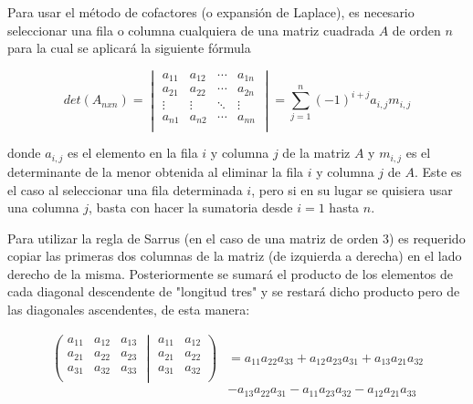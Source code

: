 \documentclass{article}
\begin{document}
Para usar el método de cofactores (o expansión de Laplace), es necesario seleccionar una fila o columna cualquiera de una matriz cuadrada $A$ de orden $n$ para la cual se aplicará la siguiente fórmula

\begin{equation}
    det(A_{nxn})
    =
    \begin{vmatrix}
        a_{11} & a_{12} & \cdots & a_{1n} \\
        a_{21} & a_{22} & \cdots & a_{2n} \\
        \vdots & \vdots & \ddots & \vdots \\
        a_{n1} & a_{n2} & \cdots & a_{nn} \\
    \end{vmatrix}
    =
    \sum_{j=1}^{n}(-1)^{i+j}a_{i,j}m_{i,j}
\end{equation}

donde $a_{i,j}$ es el elemento en la fila $i$ y columna $j$ de la matriz $A$ y $m_{i,j}$ es el determinante de la menor obtenida al eliminar la fila $i$ y columna $j$ de $A$. Este es el caso al seleccionar una fila determinada $i$, pero si en su lugar se quisiera usar una columna $j$, basta con hacer la sumatoria desde $i=1$ hasta $n$.

\vspace{5mm}

Para utilizar la regla de Sarrus (en el caso de una matriz de orden 3) es requerido copiar las primeras dos columnas de la matriz (de izquierda a derecha) en el lado derecho de la misma. Posteriormente se sumará el producto de los elementos de cada diagonal descendente de "longitud tres" y se restará dicho producto pero de las diagonales ascendentes, de esta manera:

\begin{equation}
    \begin{aligned}
        \left(
        \begin{matrix}
            a_{11} & a_{12} & a_{13} \\
            a_{21} & a_{22} & a_{23} \\
            a_{31} & a_{32} & a_{33} \\
        \end{matrix}
        \middle|
        \begin{matrix}
            a_{11} & a_{12} \\
            a_{21} & a_{22} \\
            a_{31} & a_{32} \\
        \end{matrix}
        \right)
        &= a_{11}a_{22}a_{33} + a_{12}a_{23}a_{31} + a_{13}a_{21}a_{32} \\
        & - a_{13}a_{22}a_{31} - a_{11}a_{23}a_{32} - a_{12}a_{21}a_{33}
    \end{aligned}
\end{equation}
\end{document}

